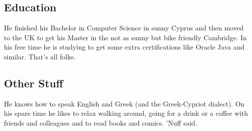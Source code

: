 \documentclass[12pt]{report}
\begin{document}
    \subsection*{Education}
    He finished his Bachelor in Computer Science in sunny Cyprus and then moved to the UK to get his Master in the not as sunny but bike friendly Cambridge. In his free time he is studying to get some extra certifications like Oracle Java and similar. That's all folks.

    \subsection*{Other Stuff}
    He knows how to speak English and Greek (and the Greek-Cypriot dialect). On his spare time he likes to relax walking around, going for a drink or a coffee with friends and colleagues and to read books and comics. 'Nuff said.
\end{document}
